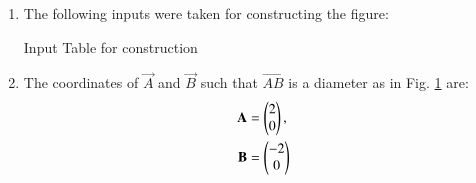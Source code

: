 \renewcommand{\theequation}{\theenumi}
\begin{enumerate}[label=\thesection.\arabic*.,ref=\thesection.\theenumi]

\begin{figure}[!ht]
\centering
\resizebox{\columnwidth}{!}{}
\caption{Using Latex-Tikz}
\label{fig:circle_latex}	
\end{figure}
%
%
%
\item The following inputs were taken for constructing the figure:
%
\begin{table}[ht!]
\centering

\caption{Input Table for construction}
\label{table:table1}	
\end{table}
\item The coordinates of  $\vec{A}$ and  $\vec{B}$ such that  $\vec{AB}$ is a diameter as in Fig. \ref{fig:circle_latex} are:
\\
%
\begin{align}
\mathbf{A} &= \begin{pmatrix}2\\0\end{pmatrix} ,
\label{eq:constr_a}
\\
 \mathbf{B} &= \begin{pmatrix}-2\\0\end{pmatrix} 
\label{eq:constr_b}
\end{align}


\end{enumerate}
